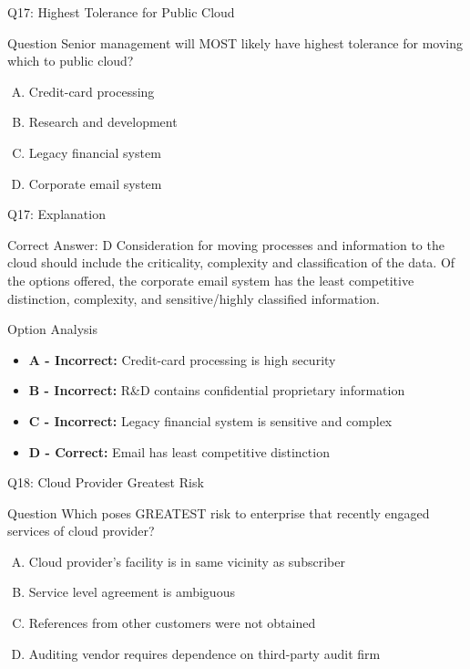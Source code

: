 \documentclass{beamer}
\begin{document}
	\begin{frame}{Q17: Highest Tolerance for Public Cloud}
		\begin{block}{Question}
			Senior management will MOST likely have highest tolerance for moving which to public cloud?
		\end{block}
		\begin{enumerate}[(A)]
			\item Credit-card processing
			\item Research and development
			\item Legacy financial system
			\item Corporate email system
		\end{enumerate}
	\end{frame}
	
	\begin{frame}{Q17: Explanation}
		\begin{block}{Correct Answer: D}
			Consideration for moving processes and information to the cloud should include the criticality, complexity and classification of the data. Of the options offered, the corporate email system has the least competitive distinction, complexity, and sensitive/highly classified information.
		\end{block}
		\begin{block}{Option Analysis}
			\begin{itemize}
				\item \textbf{A - Incorrect:} Credit-card processing is high security
				\item \textbf{B - Incorrect:} R\&D contains confidential proprietary information
				\item \textbf{C - Incorrect:} Legacy financial system is sensitive and complex
				\item \textbf{D - Correct:} Email has least competitive distinction
			\end{itemize}
		\end{block}
	\end{frame}
	
	\begin{frame}{Q18: Cloud Provider Greatest Risk}
		\begin{block}{Question}
			Which poses GREATEST risk to enterprise that recently engaged services of cloud provider?
		\end{block}
		\begin{enumerate}[(A)]
			\item Cloud provider's facility is in same vicinity as subscriber
			\item Service level agreement is ambiguous
			\item References from other customers were not obtained
			\item Auditing vendor requires dependence on third-party audit firm
		\end{enumerate}
	\end{frame}
	
\end{document}
